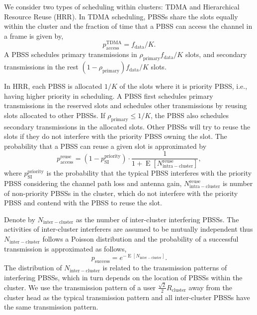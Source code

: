 \documentclass[10pt, conference, letterpaper]{IEEEtran}
\DeclareMathOperator*{\E}{\mathrm{E}}
\begin{document}
We consider two types of scheduling within clusters: TDMA and Hierarchical Resource Reuse (HRR). In TDMA scheduling, PBSSs share the slots equally within the cluster and the fraction of time that a PBSS can access the channel in a frame is given by, 
\begin{equation*}
p_{\mathrm{access}}^{\mathrm{TDMA}} = f_{\mathrm{data}}/K.
\end{equation*}
A PBSS schedules primary transmissions in ${\rho_{\mathrm{primary}}f_{\mathrm{data}}}/{K}$ slots, and secondary transmissions in the rest $(1-\rho_{\mathrm{primary}})f_{\mathrm{data}}/K$ slots. 

In HRR, each PBSS is allocated $1/K$ of the slots where it is priority PBSS, i.e., having higher priority in scheduling. 
A PBSS first schedules primary transmissions in the reserved slots and schedules other transmissions by reusing slots allocated to other PBSSs. 
If $\rho_{\mathrm{primary}}\leq 1/K$, the PBSS also schedules secondary transmissions in the allocated slots. 
Other PBSSs will try to reuse the slots if they do not interfere with the priority PBSS owning the slot.
The probability that a PBSS can reuse a given slot is approximated by
\begin{equation*}
p_{\mathrm{access}}^{\mathrm{reuse}}=(1-p_{\mathrm{SI}}^{\mathrm{priority}})\cdot \frac{1}{1+\E[N_{\mathrm{intra-cluster}}^{\mathrm{reuse}}]},
\end{equation*}
where $p_{\mathrm{SI}}^{\mathrm{priority}}$ is the probability that the typical PBSS interferes with the priority PBSS considering the channel path loss and antenna gain,  
$N_{\mathrm{intra-cluster}}^{\mathrm{reuse}}$ is number of non-priority PBSSs in the cluster, which do not interfere with the priority PBSS and contend with the PBSS to reuse the slot.


Denote by $N_{\mathrm{inter-cluster}}$ as the number of inter-cluster interfering PBSSs. 
The activities of inter-cluster interferers are assumed to be mutually independent thus $N_{\mathrm{inter-cluster}}$ follows a Poisson distribution and the probability of a successful transmission is approximated as follows, 
\begin{equation*}
p_{\mathrm{success}} = e^{-\E[N_{\mathrm{inter-cluster}}]}.
\end{equation*} 
The distribution of $N_{\mathrm{inter-cluster}}$ is related to the transmission patterns of interfering PBSSs, which in turn depends on the location of PBSSs within the cluster. 
We use the transmission pattern of a user $\frac{\sqrt{2}}{2}R_{\mathrm{cluster}}$ away from the cluster head as the typical transmission pattern and all inter-cluster PBSSs have the same transmission pattern.
\end{document}
